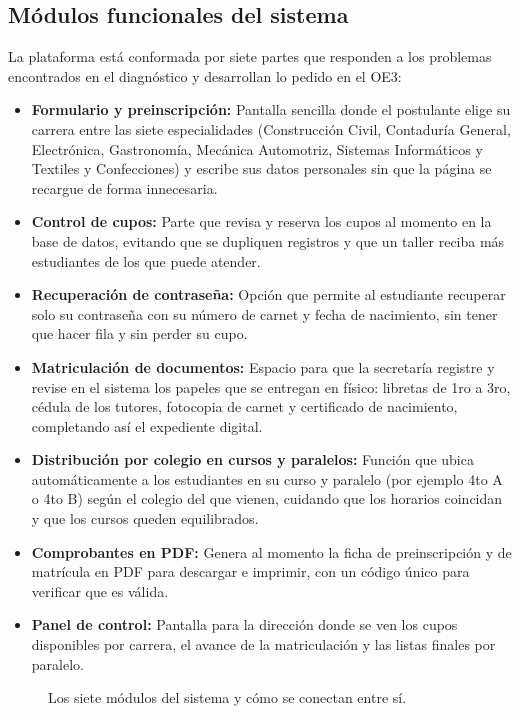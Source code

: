 \subsection{Módulos funcionales del sistema}

La plataforma está conformada por siete partes que responden a los problemas encontrados en el diagnóstico y desarrollan lo pedido en el OE3:

\begin{itemize}
    \item \textbf{Formulario y preinscripción:} Pantalla sencilla donde el postulante elige su carrera entre las siete especialidades (Construcción Civil, Contaduría General, Electrónica, Gastronomía, Mecánica Automotriz, Sistemas Informáticos y Textiles y Confecciones) y escribe sus datos personales sin que la página se recargue de forma innecesaria.
    \item \textbf{Control de cupos:} Parte que revisa y reserva los cupos al momento en la base de datos, evitando que se dupliquen registros y que un taller reciba más estudiantes de los que puede atender.
    \item \textbf{Recuperación de contraseña:} Opción que permite al estudiante recuperar solo su contraseña con su número de carnet y fecha de nacimiento, sin tener que hacer fila y sin perder su cupo.
    \item \textbf{Matriculación de documentos:} Espacio para que la secretaría registre y revise en el sistema los papeles que se entregan en físico: libretas de 1ro a 3ro, cédula de los tutores, fotocopia de carnet y certificado de nacimiento, completando así el expediente digital.
    \item \textbf{Distribución por colegio en cursos y paralelos:} Función que ubica automáticamente a los estudiantes en su curso y paralelo (por ejemplo 4to A o 4to B) según el colegio del que vienen, cuidando que los horarios coincidan y que los cursos queden equilibrados.
    \item \textbf{Comprobantes en PDF:} Genera al momento la ficha de preinscripción y de matrícula en PDF para descargar e imprimir, con un código único para verificar que es válida.
    \item \textbf{Panel de control:} Pantalla para la dirección donde se ven los cupos disponibles por carrera, el avance de la matriculación y las listas finales por paralelo.
\end{itemize}

\begin{figure}[htbp]
    \centering
    \caption{Los siete módulos del sistema y cómo se conectan entre sí.}
    \label{fig:modulos_paquetes}
    \resizebox{0.98\textwidth}{!}{%
        
    }
\end{figure}

